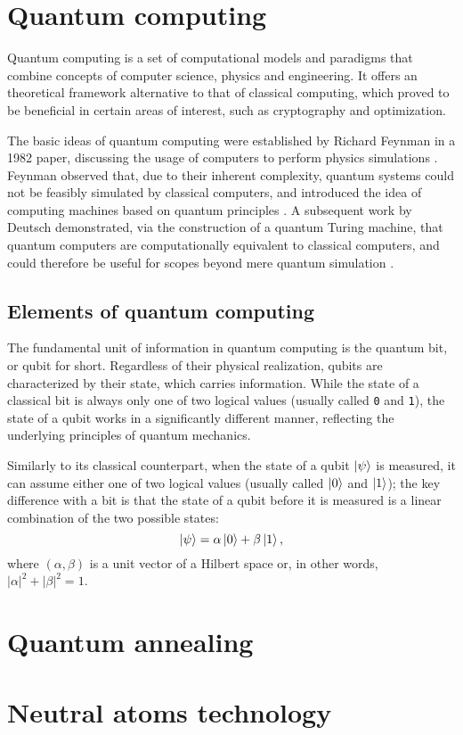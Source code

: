 \section{Quantum computing}
Quantum computing is a set of computational models and paradigms that combine concepts of computer science, physics and engineering. It offers an theoretical framework alternative to that of classical computing, which proved to be beneficial in certain areas of interest, such as cryptography and optimization. %

The basic ideas of quantum computing were established by Richard Feynman in a 1982 paper, discussing the usage of computers to perform physics simulations \cite{Feynman1982}. Feynman observed that, due to their inherent complexity, quantum systems could not be feasibly simulated by classical computers, and introduced the idea of computing machines based on quantum principles \cite{Feynman2017}. A subsequent work by Deutsch demonstrated, via the construction of a quantum Turing machine, that quantum computers are computationally equivalent to classical computers, and could therefore be useful for scopes beyond mere quantum simulation \cite{deutsch1985quantum}.

\subsection{Elements of quantum computing}
The fundamental unit of information in quantum computing is the quantum bit, or qubit for short. Regardless of their physical realization, qubits are characterized by their state, which carries information. While the state of a classical bit is always only one of two logical values (usually called \texttt{0} and \texttt{1}), the state of a qubit works in a significantly different manner, reflecting the underlying principles of quantum mechanics. 

Similarly to its classical counterpart, when the state of a qubit $\ket{\psi}$ is measured, it can assume either one of two logical values (usually called $\ket{0}$ and $\ket{1}$); the key difference with a bit is that the state of a qubit before it is measured is a linear combination of the two possible states:
\begin{equation}
  \ket{\psi} = \alpha \ket{0} + \beta \ket{1},
\end{equation}
where $(\alpha, \beta)$ is a unit vector of a Hilbert space or, in other words, $|\alpha|^{2} + |\beta|^{2} = 1$.

\section{Quantum annealing}

\section{Neutral atoms technology}
